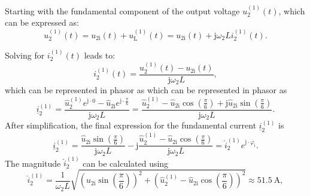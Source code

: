 \begin{solutionblock}
    Starting with the fundamental component of the output voltage $u^\mathrm{(1)}_\mathrm{2}(t)$, which can be expressed as:
    \begin{equation}
        u^\mathrm{(1)}_\mathrm{2}(t) = u_{2\mathrm{i}}(t) + u^\mathrm{(1)}_{\mathrm{L}}(t) = u_{2\mathrm{i}}(t) + \mathrm{j} \omega_\mathrm{2} L i^\mathrm{(1)}_\mathrm{2}(t).
        \label{7.1.2:eq:u_2_fund}         
    \end{equation}
   
    Solving for $i^\mathrm{(1)}_\mathrm{2}(t)$ leads to:
    \begin{equation}
        i^\mathrm{(1)}_\mathrm{2}(t) = \frac{u^\mathrm{(1)}_\mathrm{2}(t) - u_{2\mathrm{i}}(t)}{\mathrm{j} \omega_\mathrm{2} L},
        \label{7.1.2:eq:i_2_fund}         
    \end{equation}
    which can be represented in phasor as 
    which can be represented in phasor as 
    \begin{equation}
        \underline{i}^\mathrm{(1)}_\mathrm{2} = \frac{\hat{u}^\mathrm{(1)}_\mathrm{2} e^{\mathrm{j} \cdot 0} - \hat{u}_{2\mathrm{i}} e^{\mathrm{j} \cdot \frac{\pi}{6}}}{\mathrm{j} \omega_\mathrm{2} L} = \frac{\hat{u}^\mathrm{(1)}_\mathrm{2} - \hat{u}_{2\mathrm{i}} \cos(\frac{\pi}{6}) + \mathrm{j} \hat{u}_{2\mathrm{i}} \sin(\frac{\pi}{6})}{\mathrm{j} \omega_\mathrm{2} L}.
        \label{7.1.2:eq:i_2_fund_phasor}         
    \end{equation}
    After simplification, the final expression for the fundamental current $\underline{i}^\mathrm{(1)}_\mathrm{2}$ is 
    \begin{equation}
        \underline{i}^\mathrm{(1)}_\mathrm{2} = \frac{\hat{u}_{2\mathrm{i}} \sin(\frac{\pi}{6})}{\mathrm{j} \omega_\mathrm{2} L} - \mathrm{j} \frac{\hat{u}^\mathrm{(1)}_\mathrm{2} - \hat{u}_{2\mathrm{i}} \cos(\frac{\pi}{6})}{\mathrm{j} \omega_\mathrm{2} L} = \hat{i}^\mathrm{(1)}_\mathrm{2} e^{\mathrm{j} \cdot \varphi_\mathrm{i}}.
        \label{7.1.2:eq:i_2_fund_simplified}         
    \end{equation}
    The magnitude $\hat{i}^\mathrm{(1)}_\mathrm{2}$ can be calculated using 
    \begin{equation}
        \hat{i}^\mathrm{(1)}_\mathrm{2} = \frac{1}{\omega_\mathrm{2} L}\sqrt{(\hat{u}_{2\mathrm{i}} \sin(\frac{\pi}{6}))^2 + (\hat{u}^\mathrm{(1)}_\mathrm{2} - \hat{u}_{2\mathrm{i}} \cos(\frac{\pi}{6}))^2} \approx \SI{51.5}{\ampere},

\end{equation}
\end{solutionblock}
